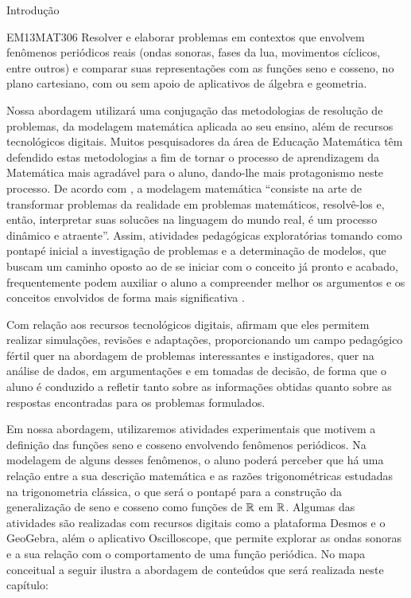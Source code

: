 \begin{apresentacao}{Introdução}
\begin{habilities}{EM13MAT306}
Resolver e elaborar problemas em contextos que envolvem fenômenos periódicos reais (ondas sonoras, fases da lua, movimentos cíclicos, entre outros) e comparar suas representações com as funções seno e cosseno, no plano cartesiano, com ou sem apoio de aplicativos de álgebra e geometria.
\end{habilities}

Nossa abordagem utilizará uma conjugação das metodologias de resolução de problemas, da modelagem matemática aplicada ao seu ensino, além de recursos tecnológicos digitais. Muitos pesquisadores da área de Educação Matemática têm defendido estas metodologias a fim de tornar o processo de aprendizagem da Matemática mais agradável para o aluno, dando-lhe mais protagonismo neste processo. De acordo com \cite{bassanezi1999}, a modelagem matemática “consiste na arte de transformar problemas da realidade em problemas matemáticos, resolvê-los e, então, interpretar suas solucões na linguagem do mundo real, é um processo dinâmico e atraente”. Assim, atividades pedagógicas exploratórias tomando como pontapé inicial a investigação de problemas e a determinação de modelos, que buscam um caminho oposto ao de se iniciar com o conceito já pronto e acabado, frequentemente podem auxiliar o aluno a compreender melhor os argumentos e os conceitos envolvidos de forma mais significativa \citep{bassanezi1999}.  

Com relação aos recursos tecnológicos digitais, \cite{ferreira2013} afirmam que eles permitem realizar simulações, revisões e adaptações, proporcionando um campo pedagógico fértil quer na abordagem de problemas interessantes e instigadores, quer na análise de dados, em argumentações e em tomadas de decisão, de forma que o aluno é conduzido a refletir tanto sobre as informações obtidas quanto sobre as respostas encontradas para os problemas formulados. 

Em nossa abordagem, utilizaremos atividades experimentais que motivem a definição das funções seno e cosseno envolvendo fenômenos periódicos. Na modelagem de alguns desses fenômenos, o aluno poderá perceber que há uma relação entre a sua descrição matemática e as razões trigonométricas estudadas na trigonometria clássica, o que será o pontapé para a construção da generalização de seno e cosseno como funções de $\mathbb{R}$ em $\mathbb{R}$. Algumas das atividades são realizadas com recursos digitais como a plataforma Desmos e o GeoGebra, além o aplicativo Oscilloscope, que permite explorar as ondas sonoras e a sua relação com o comportamento de uma função periódica. No mapa conceitual a seguir ilustra a abordagem de conteúdos que será realizada neste capítulo:


\end{apresentacao}

